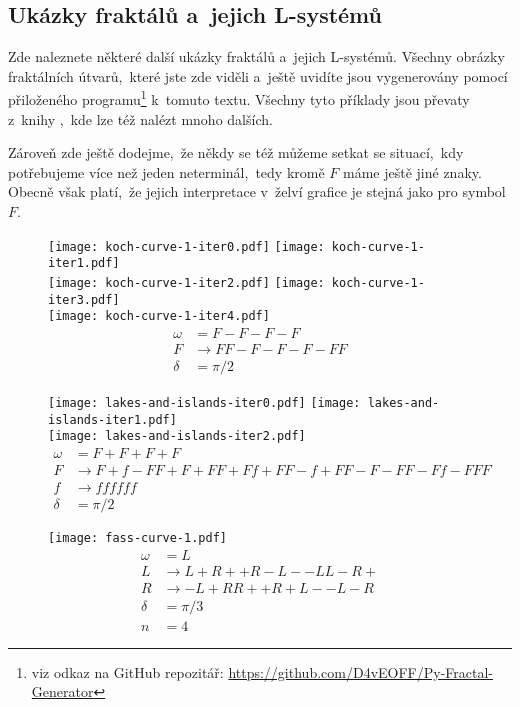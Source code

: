 \subsection{Ukázky fraktálů a~jejich L-systémů}\label{subsec:ukazky-fraktalu-lsystemy}

Zde naleznete některé další ukázky fraktálů a~jejich L-systémů. Všechny obrázky fraktálních útvarů,~které jste zde viděli a~ještě uvidíte jsou vygenerovány pomocí přiloženého programu\footnote{viz odkaz na GitHub repozitář: \url{https://github.com/D4vEOFF/Py-Fractal-Generator}} k~tomuto textu. Všechny tyto příklady jsou převaty z~knihy \cite{Prusinkiewicz1990},~kde lze též nalézt mnoho dalších.

Zároveň zde ještě dodejme,~že někdy se též můžeme setkat se situací,~kdy potřebujeme více než jeden neterminál,~tedy kromě $F$ máme ještě jiné znaky. Obecně však platí,~že jejich interpretace v~želví grafice je stejná jako pro symbol $F$.
\begin{figure}[H]
    \centering
    \texttt{[image: koch-curve-1-iter0.pdf]}\qquad
    \texttt{[image: koch-curve-1-iter1.pdf]}\qquad\\
    \texttt{[image: koch-curve-1-iter2.pdf]}\qquad
    \texttt{[image: koch-curve-1-iter3.pdf]}\qquad\\
    \texttt{[image: koch-curve-1-iter4.pdf]}\qquad
    \begin{align*}
        \omega&=F-F-F-F\\
        F&\to FF-F-F-F-FF\\
        \delta&=\pi/2
    \end{align*}
\end{figure}
\begin{figure}
    \centering
    \texttt{[image: lakes-and-islands-iter0.pdf]}\qquad
    \texttt{[image: lakes-and-islands-iter1.pdf]}\qquad\\
    \texttt{[image: lakes-and-islands-iter2.pdf]}
    \begin{align*}
        \omega&=F+F+F+F\\
        F&\to F+f-FF+F+FF+Ff+FF-f+FF-F-FF-Ff-FFF\\
        f&\to ffffff\\
        \delta&=\pi/2
    \end{align*}
\end{figure}
\begin{figure}[H]
    \centering
    \texttt{[image: fass-curve-1.pdf]}
    \begin{align*}
        \omega&=L\\
        L&\to L+R++R-L--LL-R+\\
        R&\to -L+RR++R+L--L-R\\
        \delta&=\pi/3\\
        n&=4
    \end{align*}
\end{figure}
